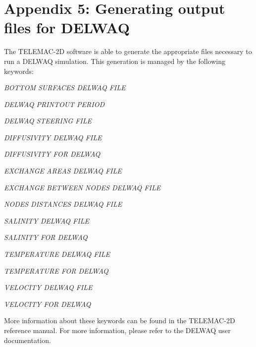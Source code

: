 


\chapter{Appendix 5:  Generating output files for DELWAQ}




 The TELEMAC-2D software is able to generate the appropriate files necessary to run a DELWAQ simulation. This generation is managed by the following keywords:



 \textit{BOTTOM SURFACES DELWAQ FILE}

 \textit{DELWAQ PRINTOUT PERIOD}

 \textit{DELWAQ STEERING FILE}

 \textit{DIFFUSIVITY DELWAQ FILE}

 \textit{DIFFUSIVITY FOR DELWAQ}

 \textit{EXCHANGE AREAS DELWAQ FILE}

 \textit{EXCHANGE BETWEEN NODES DELWAQ FILE}

 \textit{NODES DISTANCES DELWAQ FILE}

 \textit{SALINITY DELWAQ FILE}

 \textit{SALINITY FOR DELWAQ}

 \textit{TEMPERATURE DELWAQ FILE}

 \textit{TEMPERATURE FOR DELWAQ}

 \textit{VELOCITY DELWAQ FILE}

 \textit{VELOCITY FOR DELWAQ}

 More information about these keywords can be found in the TELEMAC-2D reference manual. For more information, please refer to the DELWAQ user documentation.






